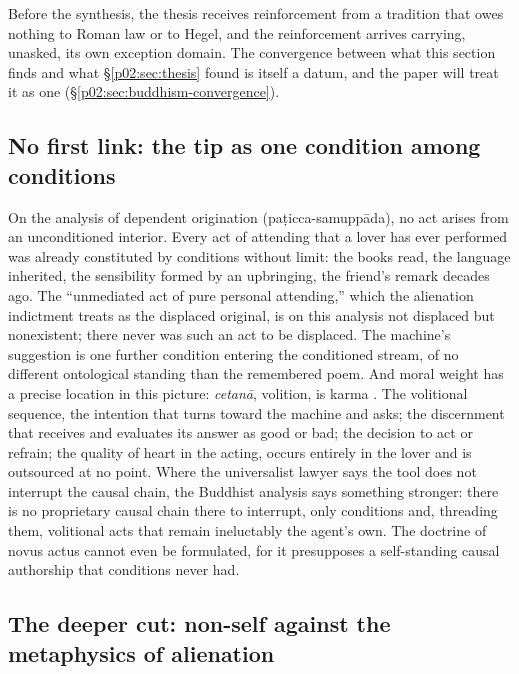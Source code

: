 Before the synthesis, the thesis receives reinforcement from a tradition that owes nothing to Roman law or to Hegel, and the reinforcement arrives carrying, unasked, its own exception domain. The convergence between what this section finds and what \S\ref{p02:sec:thesis} found is itself a datum, and the paper will treat it as one (\S\ref{p02:sec:buddhism-convergence}).

\subsection{No first link: the tip as one condition among conditions}
\label{p02:sec:buddhism-conditions}

On the analysis of dependent origination (pa\d{t}icca-samupp\=ada), no act arises from an unconditioned interior. Every act of attending that a lover has ever performed was already constituted by conditions without limit: the books read, the language inherited, the sensibility formed by an upbringing, the friend's remark decades ago. The ``unmediated act of pure personal attending,'' which the alienation indictment treats as the displaced original, is on this analysis not displaced but nonexistent; there never was such an act to be displaced. The machine's suggestion is one further condition entering the conditioned stream, of no different ontological standing than the remembered poem. And moral weight has a precise location in this picture: \emph{cetan\=a}, volition, is karma \parencite[AN 6.63]{bodhi2012numerical}. The volitional sequence, the intention that turns toward the machine and asks; the discernment that receives and evaluates its answer as good or bad; the decision to act or refrain; the quality of heart in the acting, occurs entirely in the lover and is outsourced at no point. Where the universalist lawyer says the tool does not interrupt the causal chain, the Buddhist analysis says something stronger: there is no proprietary causal chain there to interrupt, only conditions and, threading them, volitional acts that remain ineluctably the agent's own. The doctrine of novus actus cannot even be formulated, for it presupposes a self-standing causal authorship that conditions never had.

\subsection{The deeper cut: non-self against the metaphysics of alienation}
\label{p02:sec:buddhism-anatta}

